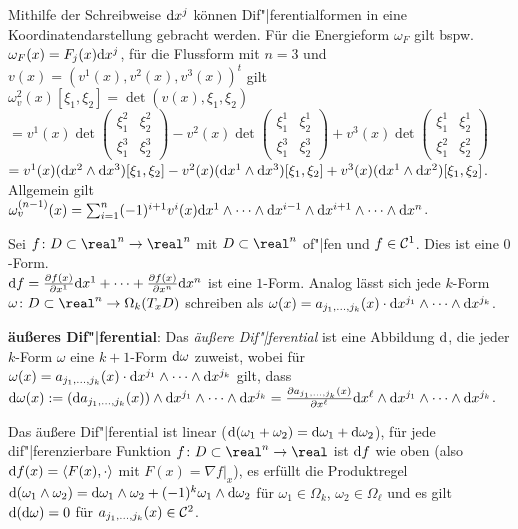 Mithilfe der Schreibweise $\mathrm{d} x^j$ können Dif"|ferentialformen in eine
Koordinatendarstellung gebracht werden.
Für die Energieform $\omega_F$ gilt bspw. $\omega_F(x) = F_j(x) \mathrm{d} x^j$,
für die Flussform mit $n = 3$ und $v(x) = (v^1(x), v^2(x), v^3(x))^t$ gilt
$\omega^2_v(x)[\xi_1, \xi_2] = \det(v(x), \xi_1, \xi_2)$ \\
$=
v^1(x) \det\begin{pmatrix}\xi_1^2 & \xi_2^2 \\ \xi_1^3 & \xi_2^3\end{pmatrix} -
v^2(x) \det\begin{pmatrix}\xi_1^1 & \xi_2^1 \\ \xi_1^3 & \xi_2^3\end{pmatrix} +
v^3(x) \det\begin{pmatrix}\xi_1^1 & \xi_2^1 \\ \xi_1^2 & \xi_2^2\end{pmatrix}$
\\
$= v^1(x) (\mathrm{d} x^2 \land \mathrm{d} x^3)[\xi_1, \xi_2] -
v^2(x) (\mathrm{d} x^1 \land \mathrm{d} x^3)[\xi_1, \xi_2] +
v^3(x) (\mathrm{d} x^1 \land \mathrm{d} x^2)[\xi_1, \xi_2]$. \\
Allgemein gilt
$\omega_v^{(n-1)}(x) = \sum_{i=1}^n (-1)^{i+1} v^i(x)
\mathrm{d} x^1 \land \dotsb \land \mathrm{d} x^{i-1} \land \mathrm{d} x^{i+1}
\land \dotsb \land \mathrm{d} x^n$.

\linie

Sei $f\colon D \subset \real^n \rightarrow \real^n$ mit $D \subset \real^n$
of"|fen und $f \in \mathcal{C}^1$.
Dies ist eine $0$-Form. \\
$\mathrm{d} f = \frac{\partial f(x)}{\partial x^1} \mathrm{d} x^1 + \dotsb +
\frac{\partial f(x)}{\partial x^n} \mathrm{d} x^n$ ist eine $1$-Form.
Analog lässt sich jede $k$-Form \\
$\omega\colon D \subset \real^n \rightarrow \Omega_k(T_x D)$ schreiben als
$\omega(x) = a_{j_1,\dotsc,j_k}(x) \cdot \mathrm{d} x^{j_1} \land \dotsb \land
\mathrm{d} x^{j_k}$.

\textbf{äußeres Dif"|ferential}:
Das \emph{äußere Dif"|ferential} ist eine Abbildung $\mathrm{d}$,
die jeder $k$-Form $\omega$ eine $k + 1$-Form $\mathrm{d} \omega$ zuweist, wobei
für $\omega(x) = a_{j_1,\dotsc,j_k}(x) \cdot \mathrm{d} x^{j_1} \land \dotsb \land
\mathrm{d} x^{j_k}$ gilt, dass \\
$\mathrm{d} \omega(x) := (\mathrm{d} a_{j_1,\dotsc,j_k}(x)) \land \mathrm{d} x^{j_1} \land
\dotsb \land \mathrm{d} x^{j_k} =
\frac{\partial a_{j_1,\dotsc,j_k}(x)}{\partial x^\ell} \mathrm{d} x^\ell \land
\mathrm{d} x^{j_1} \land \dotsb \land \mathrm{d} x^{j_k}$.

Das äußere Dif"|ferential ist linear
($\mathrm{d}(\omega_1 + \omega_2) = \mathrm{d}\omega_1 + \mathrm{d}\omega_2$),
für jede dif"|ferenzierbare Funktion
$f\colon D \subset \real^n \rightarrow \real$ ist $\mathrm{d} f$ wie
oben (also $\mathrm{d} f(x) = \left\langle{F(x), \cdot}\right\rangle$ mit $F(x) = \nabla f|_x$),
es erfüllt die Produktregel $\mathrm{d}(\omega_1 \land \omega_2) =
\mathrm{d} \omega_1 \land \omega_2 + (-1)^k \omega_1 \land \mathrm{d} \omega_2$ für
$\omega_1 \in \Omega_k$, $\omega_2 \in \Omega_\ell$ und
es gilt $\mathrm{d}(\mathrm{d} \omega) = 0$ für $a_{j_1,\dotsc,j_k}(x) \in \mathcal{C}^2$.

